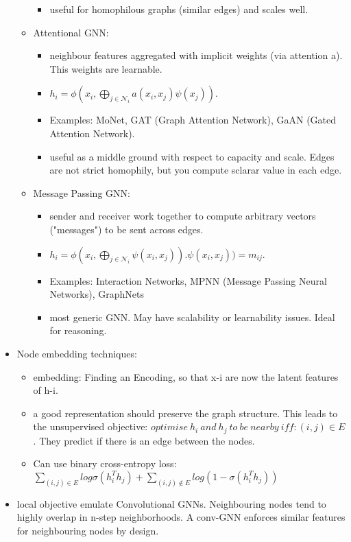 \begin{itemize}[noitemsep,nolistsep]
\begin{itemize}[noitemsep,nolistsep]
\begin{itemize}[noitemsep,nolistsep]
			\item useful for homophilous graphs (similar edges) and scales well.
		\end{itemize}
		\item Attentional GNN:
		\begin{itemize}[noitemsep,nolistsep]
			\item neighbour features aggregated with implicit weights (via attention a). This weights are learnable.
			\item $h_i = \phi (x_i, \bigoplus_{j \in \mathcal{N}_i} a(x_i,x_j)\psi(x_j))$. 
			\item Examples: MoNet, GAT (Graph Attention Network), GaAN (Gated Attention Network).
			\item useful as a middle ground with respect to capacity and scale. Edges are not strict homophily, but you compute sclarar value in each edge.
		\end{itemize}
		\item Message Passing GNN:
		\begin{itemize}[noitemsep,nolistsep]
			\item sender and receiver work together to compute arbitrary vectors ("messages") to be sent across edges.
			\item $h_i = \phi (x_i, \bigoplus_{j \in \mathcal{N}_i} \psi(x_i, x_j)). \psi(x_i, x_j)) = m_{ij}$.  
			\item Examples: Interaction Networks, MPNN (Message Passing Neural Networks), GraphNets
			\item most generic GNN. May have scalability or learnability issues. Ideal for reasoning.
		\end{itemize}
	\end{itemize}
	\item Node embedding techniques:
	\begin{itemize}[noitemsep,nolistsep]
		\item embedding: Finding an Encoding, so that x-i are now the latent features of h-i.
		\item a good representation should preserve the graph structure. This leads to the unsupervised objective: $optimise\ h_i\ and\ h_j\ to\ be\ nearby\ iff: (i,j) \in E$. They predict if there is an edge between the nodes.
		\item Can use binary cross-entropy loss: $\sum_{(i,j) \in E}log \sigma(h_i^Th_j) + \sum_{(i,j) \notin E}log (1 - \sigma(h_i^Th_j))$
	\end{itemize}
	\item local objective emulate Convolutional GNNs. Neighbouring nodes tend to highly overlap in n-step neighborhoods. A conv-GNN enforces similar features for neighbouring nodes by design.

\end{itemize}
